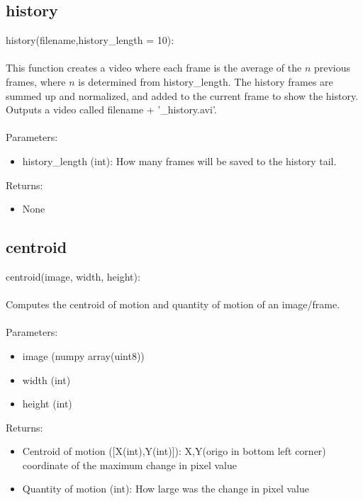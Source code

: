 \documentclass[9pt]{extarticle}
\begin{document}
\subsection{history}
history(filename,history\_length = 10):\\\\
This function  creates a video where each frame is the average of the $n$ previous frames, where $n$ is determined
from history\_length.
The history frames are summed up and normalized, and added to the current frame to show the history. \\
Outputs a video called filename + '\_history.avi'.
\\\\
Parameters:
\begin{itemize}
\item[] history\_length (int): How many frames will be saved to the history tail.
\end{itemize}
Returns:
\begin{itemize}
\item[] None
\end{itemize}

\subsection{centroid}
    centroid(image, width, height):
    \\\\
    Computes the centroid of motion and quantity of motion of an image/frame.
    \\\\
    Parameters:
    \begin{itemize}
    \item [] image (numpy array(uint8))
    \item [] width (int)
    \item [] height (int)
    \end{itemize}
    Returns:
    \begin{itemize}
    \item [] Centroid of motion ([X(int),Y(int)]): X,Y(origo in bottom left corner) coordinate of the maximum change in pixel value
    \item [] Quantity of motion (int): How large was the change in pixel value
    \end{itemize}
\end{document}
